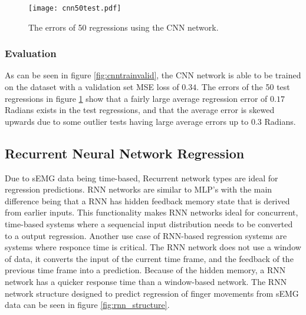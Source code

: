 \documentclass[../main.tex]{subfiles}
\begin{document}
\begin{figure}[H]
\begin{center}
\texttt{[image: cnn50test.pdf]}
\caption{The errors of 50 regressions using the CNN network.}
\label{fig:cnntest}
\end{center}
\end{figure}


\subsubsection{Evaluation}

As can be seen in figure \ref{fig:cnntrainvalid}, the CNN network is able to be trained on the dataset with a validation set MSE loss of $0.34$.
The errors of the 50 test regressions in figure \ref{fig:cnntest} show that a fairly large average regression error of $0.17$ Radians exists in the test regressions, and that the average error is skewed upwards due to some outlier tests having large average errors up to $0.3$ Radians.



\subsection{Recurrent Neural Network Regression}

Due to sEMG data being time-based, Recurrent network types are ideal for regression predictions.
RNN networks are similar to MLP's with the main difference being that a RNN has hidden feedback  memory state that is derived from earlier inputs.
This functionality makes RNN networks ideal for concurrent, time-based systems where a sequencial input distribution needs to be converted to a output regression.  
Another use case of RNN-based regression systems are systems where responce time is critical.
The RNN network does not use a window of data, it converts the input of the current time frame, and the feedback of the previous time frame into a prediction.
Because of the hidden memory, a RNN network has a quicker response time than a window-based network.
The RNN network structure designed to predict regression of finger movements from sEMG data can be seen in figure \ref{fig:rnn_structure}.
\end{document}
